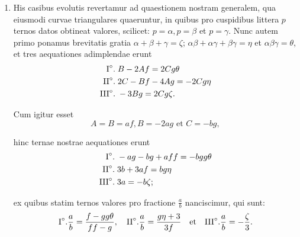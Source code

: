 \documentclass[10pt,a4paper]{article}
\begin{document}
\begin{paracol}{2}
\begin{enumerate}[topsep=1px]
		\switchcolumn*
		
		\item His casibus evolutis revertamur ad quaestionem nostram generalem, qua eiusmodi curvae triangulares quaeruntur, in quibus pro cuspidibus littera $p$ ternos datos obtineat valores, scilicet: $p=\alpha, p=\beta$ et $p=\gamma$. Nunc autem primo ponamus brevitatis gratia $\alpha+\beta+\gamma = \zeta$; $\alpha\beta + \alpha \gamma + \beta \gamma = \eta$ et $\alpha \beta \gamma = \theta$, et tres aequationes adimplendae erunt
		\begin{align*}
			\text{I}\degree. \;&B -2Af = 2Cg\theta\\
			\text{II}\degree. \;& 2C-Bf-4Ag = -2Cg\eta\\
			\text{III}\degree. \;& -3Bg = 2Cg\zeta.
		\end{align*}
		\par Cum igitur esset
		\[
			A=B=af, B=-2ag \text{ et } C= -bg,
		\]
		\par hinc ternae nostrae aequationes erunt
		\begin{align*}
			\text{I}\degree. \;& -ag -bg+aff = -bgg\theta\\
			\text{II}\degree. \;& 3b +3af = bg\eta\\
			\text{III}\degree. \;& 3a=-b\zeta;		
		\end{align*}
		\par ex quibus statim ternos valores pro fractione $\frac{a}{b}$ nanciscimur, qui sunt:
		\[
			\text{I}\degree. \frac{a}{b} = \frac{f-gg\theta}{ff-g},\quad  \text{II}\degree. \frac{a}{b} = \frac{g\eta + 3}{3f} \quad \text{et}\quad \text{III}\degree. \frac{a}{b} = -\frac{\zeta}{3}.
		\]
		

\end{enumerate}
\end{paracol}
\end{document}
